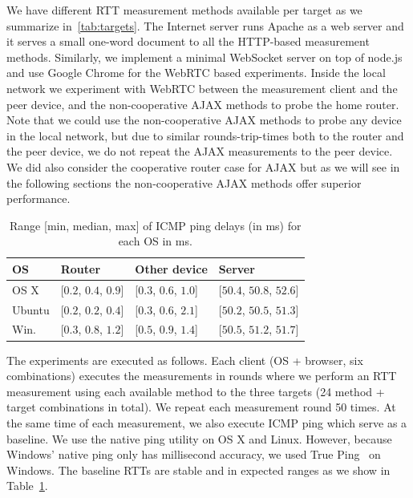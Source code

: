 \documentclass[12pt,twoside]{book}
\begin{document}
We have different RTT measurement methods available per target as we summarize in~\autoref{tab:targets}. 
The Internet server runs Apache as a web server and it serves a small one-word document to all the HTTP-based measurement methods. Similarly, we implement a minimal WebSocket server on top of node.js~\cite{socketio} and use Google Chrome for the WebRTC based experiments. 
Inside the local network we experiment with WebRTC between the measurement client and the peer device, and the non-cooperative AJAX methods to probe the home router. Note that we could use the non-cooperative AJAX methods to probe any device in the local network, but due to similar rounds-trip-times both to the router and the peer device, we do not repeat the AJAX measurements to the peer device. We did also consider the cooperative router case for AJAX but as we will see in the following sections the non-cooperative AJAX methods offer superior performance. %

\begin{table}[tb]
\label{tab:ping_range}
\centering
\begin{small}
\begin{tabular}{llll}
\toprule
OS & Router & Other device & Server \\
\midrule
OS X & {[$0.2$, $0.4$, $0.9$]} & {[$0.3$, $0.6$, $1.0$]} & {[$50.4$, $50.8$, $52.6$]}\\
Ubuntu & {[$0.2$, $0.2$, $0.4$]} & {[$0.3$, $0.6$, $2.1$]} & {[$50.2$, $50.5$, $51.3$]}\\
Win. & {[$0.3$, $0.8$, $1.2$]} & {[$0.5$, $0.9$, $1.4$]} & {[$50.5$, $51.2$, $51.7$]}\\
\bottomrule
\end{tabular}
\end{small}
\caption {Range [min, median, max] of ICMP ping delays (in ms) for each OS in ms.} 
\label{tab:ping_range}
\end{table}

The experiments are executed as follows. Each client (OS + browser, six combinations) executes the measurements in rounds where we perform an RTT measurement using each available method to the three targets (24 method + target combinations in total). We repeat each measurement round 50 times. At the same time of each measurement, we also execute ICMP ping which serve as a baseline. We use the native ping utility on OS X and Linux. However, because Windows' native ping only has millisecond accuracy, we used True Ping~\cite{tping_windows} on Windows. The baseline RTTs are stable and in expected ranges as we show in Table~\ref{tab:ping_range}.
\end{document}
